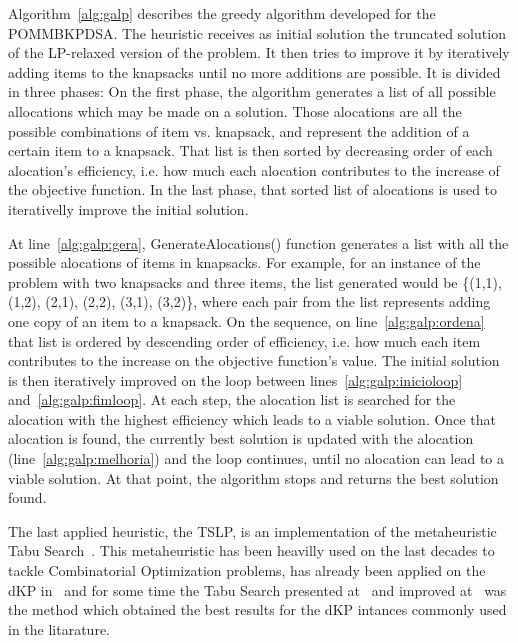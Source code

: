 Algorithm~\ref{alg:galp} describes the greedy algorithm developed for the POMMBKPDSA. The heuristic receives as initial solution 
the truncated solution of the LP-relaxed version of the problem. It then tries to improve it by iteratively adding items to the 
knapsacks until no more additions are possible. It is divided in three phases: On the first phase, the algorithm generates a list
of all possible allocations which may be made on a solution. Those alocations are all the possible combinations of item vs. knapsack, 
and represent the addition of a certain item to a knapsack. That list is then sorted by decreasing order of each alocation's efficiency,
i.e. how much each alocation contributes to the increase of the objective function. In the last phase, that sorted list of alocations
is used to iterativelly improve the initial solution.



At line~\ref{alg:galp:gera}, GenerateAlocations() function generates a list with all the possible alocations of items in knapsacks. 
For example, for an instance of the problem with two knapsacks and three items, the list generated would be \{(1,1), (1,2), (2,1), (2,2), (3,1), (3,2)\},
where each pair from the list represents adding one copy of an item to a knapsack. On the sequence, on line~\ref{alg:galp:ordena} that list is 
ordered by descending order of efficiency, i.e. how much each item contributes to the increase on the objective function's value. The initial solution is 
then iteratively improved on the loop between lines~\ref{alg:galp:inicioloop} 
and~\ref{alg:galp:fimloop}. At each step, the alocation list is searched for the alocation with the highest efficiency which leads to a viable solution.
Once that alocation is found, the currently best solution is updated with the alocation (line~\ref{alg:galp:melhoria}) and the loop continues, until no
alocation can lead to a viable solution. At that point, the algorithm stops and returns the best solution found.

The last applied heuristic, the TSLP, is an implementation of the metaheuristic Tabu Search~\cite{glover1989tabup1}. This metaheuristic has been heavilly used on the
last decades to tackle Combinatorial Optimization problems, has already been applied on the dKP in~\cite{danmeyer1993} and for some time the Tabu Search presented at~\cite{vasquez2001} 
and improved at~\cite{vasquez2005} was the method which obtained the best results for the dKP intances commonly used in the litarature.

